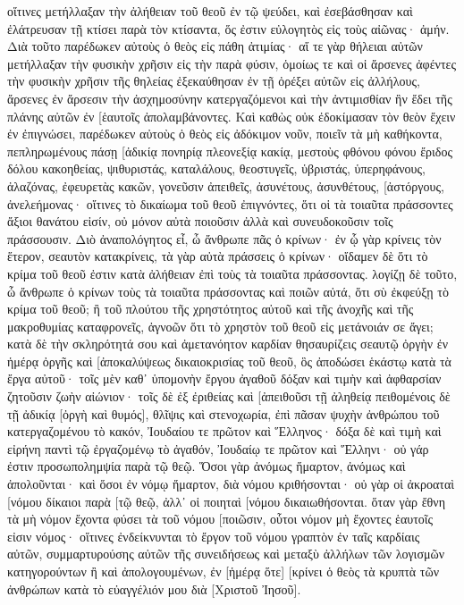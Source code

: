 οἵτινες μετήλλαξαν τὴν ἀλήθειαν τοῦ θεοῦ ἐν τῷ ψεύδει, καὶ ἐσεβάσθησαν καὶ ἐλάτρευσαν τῇ κτίσει παρὰ τὸν κτίσαντα, ὅς ἐστιν εὐλογητὸς εἰς τοὺς αἰῶνας· ἀμήν. 
Διὰ τοῦτο παρέδωκεν αὐτοὺς ὁ θεὸς εἰς πάθη ἀτιμίας· αἵ τε γὰρ θήλειαι αὐτῶν μετήλλαξαν τὴν φυσικὴν χρῆσιν εἰς τὴν παρὰ φύσιν, 
ὁμοίως τε καὶ οἱ ἄρσενες ἀφέντες τὴν φυσικὴν χρῆσιν τῆς θηλείας ἐξεκαύθησαν ἐν τῇ ὀρέξει αὐτῶν εἰς ἀλλήλους, ἄρσενες ἐν ἄρσεσιν τὴν ἀσχημοσύνην κατεργαζόμενοι καὶ τὴν ἀντιμισθίαν ἣν ἔδει τῆς πλάνης αὐτῶν ἐν [ἑαυτοῖς ἀπολαμβάνοντες. 
Καὶ καθὼς οὐκ ἐδοκίμασαν τὸν θεὸν ἔχειν ἐν ἐπιγνώσει, παρέδωκεν αὐτοὺς ὁ θεὸς εἰς ἀδόκιμον νοῦν, ποιεῖν τὰ μὴ καθήκοντα, 
πεπληρωμένους πάσῃ [ἀδικίᾳ πονηρίᾳ πλεονεξίᾳ κακίᾳ, μεστοὺς φθόνου φόνου ἔριδος δόλου κακοηθείας, ψιθυριστάς, 
καταλάλους, θεοστυγεῖς, ὑβριστάς, ὑπερηφάνους, ἀλαζόνας, ἐφευρετὰς κακῶν, γονεῦσιν ἀπειθεῖς, 
ἀσυνέτους, ἀσυνθέτους, [ἀστόργους, ἀνελεήμονας· 
οἵτινες τὸ δικαίωμα τοῦ θεοῦ ἐπιγνόντες, ὅτι οἱ τὰ τοιαῦτα πράσσοντες ἄξιοι θανάτου εἰσίν, οὐ μόνον αὐτὰ ποιοῦσιν ἀλλὰ καὶ συνευδοκοῦσιν τοῖς πράσσουσιν. 
Διὸ ἀναπολόγητος εἶ, ὦ ἄνθρωπε πᾶς ὁ κρίνων· ἐν ᾧ γὰρ κρίνεις τὸν ἕτερον, σεαυτὸν κατακρίνεις, τὰ γὰρ αὐτὰ πράσσεις ὁ κρίνων· 
οἴδαμεν δὲ ὅτι τὸ κρίμα τοῦ θεοῦ ἐστιν κατὰ ἀλήθειαν ἐπὶ τοὺς τὰ τοιαῦτα πράσσοντας. 
λογίζῃ δὲ τοῦτο, ὦ ἄνθρωπε ὁ κρίνων τοὺς τὰ τοιαῦτα πράσσοντας καὶ ποιῶν αὐτά, ὅτι σὺ ἐκφεύξῃ τὸ κρίμα τοῦ θεοῦ; 
ἢ τοῦ πλούτου τῆς χρηστότητος αὐτοῦ καὶ τῆς ἀνοχῆς καὶ τῆς μακροθυμίας καταφρονεῖς, ἀγνοῶν ὅτι τὸ χρηστὸν τοῦ θεοῦ εἰς μετάνοιάν σε ἄγει; 
κατὰ δὲ τὴν σκληρότητά σου καὶ ἀμετανόητον καρδίαν θησαυρίζεις σεαυτῷ ὀργὴν ἐν ἡμέρᾳ ὀργῆς καὶ [ἀποκαλύψεως δικαιοκρισίας τοῦ θεοῦ, 
ὃς ἀποδώσει ἑκάστῳ κατὰ τὰ ἔργα αὐτοῦ· 
τοῖς μὲν καθ᾽ ὑπομονὴν ἔργου ἀγαθοῦ δόξαν καὶ τιμὴν καὶ ἀφθαρσίαν ζητοῦσιν ζωὴν αἰώνιον· 
τοῖς δὲ ἐξ ἐριθείας καὶ [ἀπειθοῦσι τῇ ἀληθείᾳ πειθομένοις δὲ τῇ ἀδικίᾳ [ὀργὴ καὶ θυμός], 
θλῖψις καὶ στενοχωρία, ἐπὶ πᾶσαν ψυχὴν ἀνθρώπου τοῦ κατεργαζομένου τὸ κακόν, Ἰουδαίου τε πρῶτον καὶ Ἕλληνος· 
δόξα δὲ καὶ τιμὴ καὶ εἰρήνη παντὶ τῷ ἐργαζομένῳ τὸ ἀγαθόν, Ἰουδαίῳ τε πρῶτον καὶ Ἕλληνι· 
οὐ γάρ ἐστιν προσωπολημψία παρὰ τῷ θεῷ. 
Ὅσοι γὰρ ἀνόμως ἥμαρτον, ἀνόμως καὶ ἀπολοῦνται· καὶ ὅσοι ἐν νόμῳ ἥμαρτον, διὰ νόμου κριθήσονται· 
οὐ γὰρ οἱ ἀκροαταὶ [νόμου δίκαιοι παρὰ [τῷ θεῷ, ἀλλ᾽ οἱ ποιηταὶ [νόμου δικαιωθήσονται. 
ὅταν γὰρ ἔθνη τὰ μὴ νόμον ἔχοντα φύσει τὰ τοῦ νόμου [ποιῶσιν, οὗτοι νόμον μὴ ἔχοντες ἑαυτοῖς εἰσιν νόμος· 
οἵτινες ἐνδείκνυνται τὸ ἔργον τοῦ νόμου γραπτὸν ἐν ταῖς καρδίαις αὐτῶν, συμμαρτυρούσης αὐτῶν τῆς συνειδήσεως καὶ μεταξὺ ἀλλήλων τῶν λογισμῶν κατηγορούντων ἢ καὶ ἀπολογουμένων, 
ἐν [ἡμέρᾳ ὅτε] [κρίνει ὁ θεὸς τὰ κρυπτὰ τῶν ἀνθρώπων κατὰ τὸ εὐαγγέλιόν μου διὰ [Χριστοῦ Ἰησοῦ]. 
